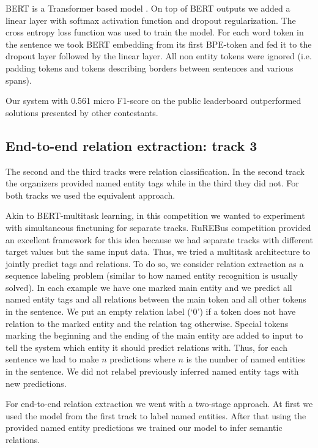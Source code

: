 \documentclass{dialogue}
\begin{document}
BERT is a Transformer based model \cite{attention}. On top of BERT outputs we added a linear layer with softmax activation function and dropout regularization. The cross entropy loss function was used to train the model. For each word token in the sentence we took BERT embedding from its first BPE-token and fed it to the dropout layer followed by the linear layer. All non entity tokens were ignored (i.e. padding tokens and tokens describing borders between sentences and various spans).

Our system with 0.561 micro F1-score on the public leaderboard outperformed solutions presented by other contestants.

\subsection{End-to-end relation extraction: track 3}
The second and the third tracks were relation classification. In the second track the organizers provided named entity tags while in the third they did not. For both tracks we used the equivalent approach.

Akin to BERT-multitask learning, in this competition we wanted to experiment with simultaneous finetuning for separate tracks. RuREBus competition provided an excellent framework for this idea because we had separate tracks with different target values but the same input data. Thus, we tried a multitask architecture to jointly predict tags and relations. To do so, we consider relation extraction as a sequence labeling problem (similar to how named entity recognition is usually solved). In each example we have one marked main entity and we predict all named entity tags and all relations between the main token and all other tokens in the sentence. We put an empty relation label (‘0’) if a token does not have relation to the marked entity and the relation tag otherwise. Special tokens marking the beginning and the ending of the main entity are added to input to tell the system which entity it should predict relations with. Thus, for each sentence we had to make $n$ predictions where $n$ is the number of named entities in the sentence. We did not relabel previously inferred named entity tags with new predictions.

For end-to-end relation extraction we went with a two-stage approach. At first we used the model from the first track to label named entities. After that using the provided named entity predictions we trained our model to infer semantic relations.
\end{document}
